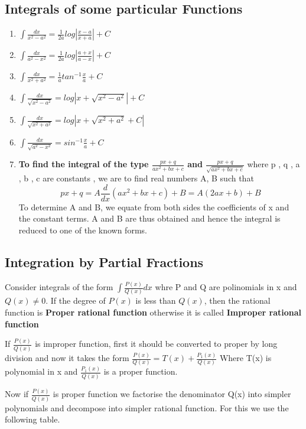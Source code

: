 \documentclass[12pt]{article}
\begin{document}
    \subsection*{Integrals of some particular Functions}
    \begin{enumerate}
        \item $\int \frac{dx}{x^2-a^2}=\frac{1}{2a} log|\frac{x-a}{x+a}|+C$
        \item  $\int \frac{dx}{a^2-x^2}=\frac{1}{2a} log|\frac{a+x}{a-x}|+C$
        \item $\int \frac{dx}{x^2+a^2}=\frac{1}{a} tan^{-1}\frac{x}{a}+C$
        \item $\int \frac{dx}{\sqrt{x^2-a^2}}=log|x+\sqrt{x^2-a^2}|+C$
        \item $\int \frac{dx}{\sqrt{x^2+a^2}}=log|x+\sqrt{x^2+a^2}+C|$
        \item $\int \frac{dx}{\sqrt{a^2-x^2}}= sin^{-1}\frac{x}{a}+C$
        \item \textbf{To find the integral of the type $\frac{px+q}{ax^2+bx+c}$ and $\frac{px+q}{\sqrt{ax^2+bx+c}}$ } where p , q , a , b , c are constants , we are to find real numbers A, B such that $$px+q=A\frac{d}{dx}(ax^2+bx+c)+B= A (2ax+b)+B$$ To determine A and B, we equate from both sides the coefficients of x and the
        constant terms. A and B are thus obtained and hence the integral is reduced to
        one of the known forms.
    \end{enumerate}

    \subsection*{Integration by Partial Fractions}
    Consider integrals of the form  $\int \frac{P(x)}{Q(x)} dx $ whre P and Q are polinomials in x and $Q(x) \not = 0$. If the degree of $P(x)$ is less than $Q(x)$, then the rational function is \textbf{Proper rational function} otherwise it is called \textbf{Improper rational function}


    If $\frac{P(x)}{Q(x)}$ is improper function, first it should be converted to proper by long division and now it takes the form  $\frac{P(x)}{Q(x)}=T(x)+\frac{P_1(x)}{Q(x)}$    Where T(x) is polynomial in x and    $\frac{P_1(x)}{Q(x)}$     is a proper function.

    Now if $\frac{P(x)}{Q(x)}$     is proper function we factorise the denominator Q(x) into simpler polynomials and decompose into simpler rational function. For this we use the following table.
\end{document}

